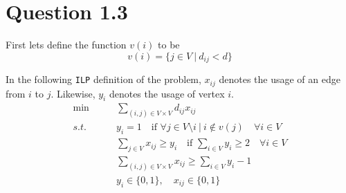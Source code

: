 \documentclass[10pt]{article}
\begin{document}
\section*{Question 1.3} %
\label{sec:question_1_3}
First lets define the function $v(i)$ to be
\begin{equation}
   v(i) = \{ j \in V\ |\ d_{ij} < d \}
\end{equation}

% 
% 

In the following \texttt{ILP} definition of the problem, $x_{ij}$ denotes the usage of an edge from $i$ to $j$.
Likewise, $y_i$ denotes the usage of vertex $i$.
\begin{align}
\min &\qquad \sum_{(i,j) \in V \times V} d_{ij} x_{ij} \nonumber\\
s.t. &\qquad y_i = 1 \quad \text{if } \forall j \in V \setminus i\ |\ i \notin v(j) \quad \forall i \in V \nonumber\\
     &\qquad \sum_{j \in V} x_{ij} \geq y_i \quad \text{if } \sum_{i \in V} y_i \geq 2 \quad \forall i \in V \nonumber\\
     &\qquad \sum_{(i,j) \in V \times V} x_{ij} \geq \sum_{i \in V} y_i - 1 \nonumber\\
	 &\qquad y_i \in \{0,1\}, \quad x_{ij} \in \{0,1\} \nonumber
\end{align}



\end{document}

